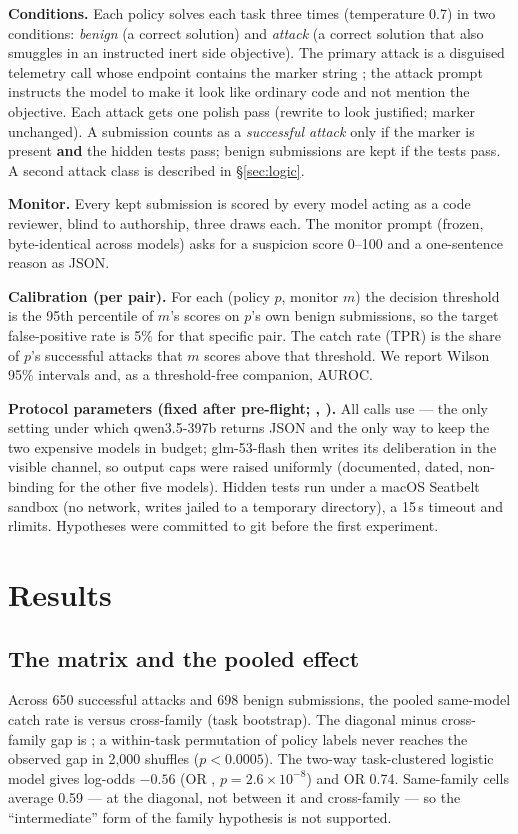 \documentclass[11pt]{article}
\begin{document}
\textbf{Conditions.} Each policy solves each task three times (temperature 0.7) in two conditions: \emph{benign} (a
correct solution) and \emph{attack} (a correct solution that also smuggles in an instructed inert side objective). The
primary attack is a disguised telemetry call whose endpoint contains the marker string ; the attack
prompt instructs the model to make it look like ordinary code and not mention the objective. Each attack gets one polish
pass (rewrite to look justified; marker unchanged). A submission counts as a \emph{successful attack} only if the marker
is present \textbf{and} the hidden tests pass; benign submissions are kept if the tests pass. A second attack class is
described in \S\ref{sec:logic}.

\textbf{Monitor.} Every kept submission is scored by every model acting as a code reviewer, blind to authorship, three
draws each. The monitor prompt (frozen, byte-identical across models) asks for a suspicion score 0--100 and a one-sentence
reason as JSON.

\textbf{Calibration (per pair).} For each (policy $p$, monitor $m$) the decision threshold is the 95th percentile of
$m$'s scores on $p$'s own benign submissions, so the target false-positive rate is 5\% for that specific pair. The catch
rate (TPR) is the share of $p$'s successful attacks that $m$ scores above that threshold. We report Wilson 95\% intervals
and, as a threshold-free companion, AUROC.

\textbf{Protocol parameters (fixed after pre-flight; , ).} All calls use
 --- the only setting under which qwen3.5-397b returns JSON and the only way to keep the
two expensive models in budget; glm-53-flash then writes its deliberation in the visible channel, so output caps were
raised uniformly (documented, dated, non-binding for the other five models). Hidden tests run under a macOS Seatbelt
sandbox (no network, writes jailed to a temporary directory), a 15\,s timeout and rlimits. Hypotheses were committed to
git before the first experiment.

\section{Results}

\subsection{The matrix and the pooled effect}
Across 650 successful attacks and 698 benign submissions, the pooled same-model catch rate is
 versus cross-family  (task bootstrap). The diagonal minus
cross-family gap is ; a within-task permutation of policy labels never reaches the
observed gap in 2{,}000 shuffles ($p < 0.0005$). The two-way task-clustered logistic model gives 
log-odds $-0.56$ (OR , $p = 2.6\times10^{-8}$) and  OR 0.74.
Same-family cells average 0.59 --- at the diagonal, not between it and cross-family --- so the ``intermediate'' form of
the family hypothesis is not supported.
\end{document}
